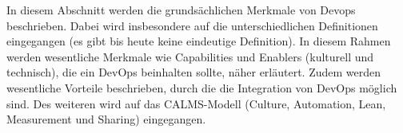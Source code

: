 In diesem Abschnitt werden die grundsächlichen Merkmale von Devops beschrieben. Dabei wird insbesondere auf die unterschiedlichen Definitionen eingegangen (es gibt bis heute keine eindeutige Definition). In diesem Rahmen werden wesentliche Merkmale wie Capabilities und Enablers (kulturell und technisch), die ein DevOps beinhalten sollte, näher erläutert. Zudem werden wesentliche Vorteile beschrieben, durch die die Integration von DevOps möglich sind. Des weiteren wird auf das CALMS-Modell (Culture, Automation, Lean, Measurement und Sharing) eingegangen.